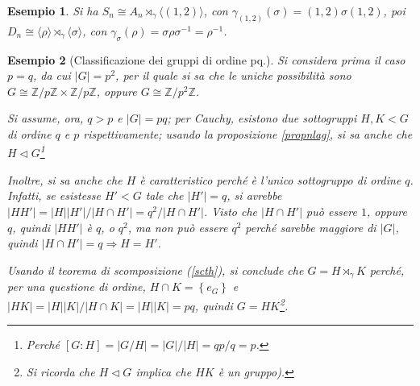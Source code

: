 \documentclass[11pt]{scrartcl}
\theoremstyle{style1}
\newtheorem{esempio}{Esempio}[section]
\numberwithin{equation}{subsection}
\begin{document}
\begin{esempio}
Si ha $S_n \cong A_n \rtimes _\gamma \langle (1,2) \rangle$, con $\gamma_{(1,2)} (\sigma ) = (1,2) \sigma (1,2)$, poi $D_n \cong \langle \rho  \rangle\rtimes _\gamma \langle \sigma  \rangle$, con $\gamma_\sigma (\rho ) = \sigma \rho \sigma ^{-1}=\rho ^{-1}$.
\end{esempio}
\begin{esempio}
	[Classificazione dei gruppi di ordine pq.]
	Si considera prima il caso $p=q$, da cui $\lvert G \rvert  = p^2$, per il quale si sa che le uniche possibilit\`a sono $G \cong \mathbb{Z}/p\mathbb{Z} \times \mathbb{Z} / p \mathbb{Z}$, oppure $G\cong\mathbb{Z} / p ^2 \mathbb{Z}$.

	Si assume, ora, $q>p$ e $\lvert G \rvert = pq$; per Cauchy, esistono due sottogruppi $H,K < G$ di ordine $q$ e $p$ rispettivamente; usando la proposizione \ref{propnlag}, si sa anche che $H \lhd G$\footnote{Perch\'e $[G:H] = \lvert G / H \rvert = \lvert G  \rvert / \lvert H \rvert = qp / q =p $.}
	
	Inoltre, si sa anche che $H$ \`e caratteristico perch\'e \`e l'unico sottogruppo di ordine $q$. 
	Infatti, se esistesse $H'<G$ tale che $\lvert H' \rvert =q$, si avrebbe $\lvert H H' \rvert = \lvert H \rvert \lvert H' \rvert  / \lvert H \cap H' \rvert = q^2 / \lvert H\cap H' \rvert $. 
	Visto che $\lvert H\cap H' \rvert $ pu\`o essere $1$, oppure $q$, quindi $\lvert H H' \rvert $ \`e $q$, o $q^2$, ma non pu\`o essere $q^2 $ perch\'e sarebbe maggiore di $\lvert G \rvert $, quindi $\lvert H\cap H' \rvert = q \Rightarrow H = H'$.

	Usando il teorema di scomposizione (\ref{scth}), si conclude che $G = H \rtimes _\gamma K$ perch\'e, per una questione di ordine, $H\cap K = \left\{ e_G \right\} $ e $\lvert HK \rvert = \lvert H \rvert \lvert K \rvert / \lvert H\cap K \rvert = \lvert H  \rvert \lvert K \rvert =pq$, quindi $G = HK$\footnote{Si ricorda che $H\lhd G$ implica che $HK$ \`e un gruppo).}.


\end{esempio}
\end{document}
